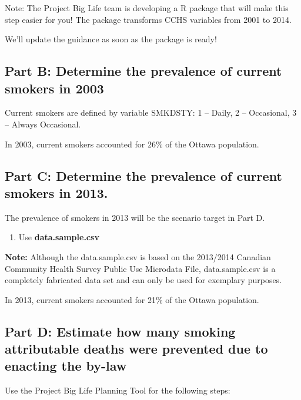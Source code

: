 \documentclass[]{book}
\providecommand{\tightlist}{%
  \setlength{\itemsep}{0pt}\setlength{\parskip}{0pt}}
\begin{document}
Note: The Project Big Life team is developing a R package that will make
this step easier for you! The package transforms CCHS variables from
2001 to 2014.

We'll update the guidance as soon as the package is ready!

\subsection{Part B: Determine the prevalence of current smokers in
2003}\label{part-b-determine-the-prevalence-of-current-smokers-in-2003}

Current smokers are defined by variable SMKDSTY: 1 -- Daily, 2 --
Occasional, 3 -- Always Occasional.

In 2003, current smokers accounted for 26\% of the Ottawa population.

\subsection{Part C: Determine the prevalence of current smokers in
2013.}\label{part-c-determine-the-prevalence-of-current-smokers-in-2013.}

The prevalence of smokers in 2013 will be the scenario target in Part D.

\begin{enumerate}
\def\labelenumi{\arabic{enumi}.}
\tightlist
\item
  Use \textbf{data.sample.csv}
\end{enumerate}

\textbf{Note:} Although the data.sample.csv is based on the 2013/2014
Canadian Community Health Survey Public Use Microdata File,
data.sample.csv is a completely fabricated data set and can only be used
for exemplary purposes.

In 2013, current smokers accounted for 21\% of the Ottawa population.

\subsection{Part D: Estimate how many smoking attributable deaths were
prevented due to enacting the
by-law}\label{part-d-estimate-how-many-smoking-attributable-deaths-were-prevented-due-to-enacting-the-by-law}

Use the Project Big Life Planning Tool for the following steps:
\end{document}
